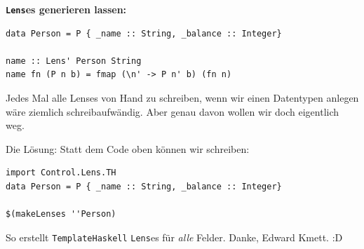 \documentclass{beamer}
\begin{document}

\begin{frame}[fragile]

\textbf{\texttt{Lens}es generieren lassen:}\smallskip

\begin{verbatim}
data Person = P { _name :: String, _balance :: Integer}

name :: Lens' Person String
name fn (P n b) = fmap (\n' -> P n' b) (fn n)
\end{verbatim}

Jedes Mal alle Lenses von Hand zu schreiben, wenn wir einen Datentypen anlegen
wäre ziemlich schreibaufwändig. Aber genau davon wollen wir doch eigentlich weg.
\pause

Die Lösung: Statt dem Code oben können wir schreiben:

\begin{verbatim}
import Control.Lens.TH
data Person = P { _name :: String, _balance :: Integer}

$(makeLenses ''Person)
\end{verbatim}

So erstellt \texttt{TemplateHaskell} \texttt{Lens}es für \emph{alle} Felder. Danke, Edward Kmett. :D

\end{frame}

\end{document}
